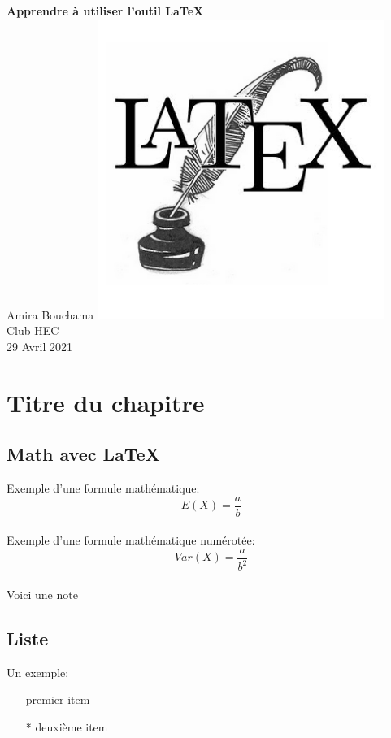 \documentclass[a4paper,12pt]{report}
\begin{document}
\begin{titlepage}
    \begin{center}
        \vspace*{1cm}
        \Huge
        \vspace{0.5cm}
        \Huge
        \textbf{Apprendre à utiliser l'outil LaTeX}\\
        \vspace{1.5cm}
        \Huge
		Amira Bouchama
        \vfill
 		 \vspace{0.5cm}
 		 \includegraphics[width=0.7\textwidth]{LatexLogo}\\
 		  \large
		Club HEC\\
         \large
        29 Avril 2021
    \end{center}
\end{titlepage}
\chapter{Titre du chapitre}
\section{Math avec LaTeX}
Exemple d'une formule mathématique:
$$E(X)=\frac{a}{b}$$ %
\\Exemple d'une formule mathématique numérotée:
\begin{equation}
Var(X)=\frac{a}{b^{2}}
\end{equation} %
\\Voici une note\footnotemark {}
\newpage
\section{Liste}
Un exemple:
\begin{itemize}
\item[\textbullet] premier item
\item[*] deuxième item
\end{itemize}
\end{document}
